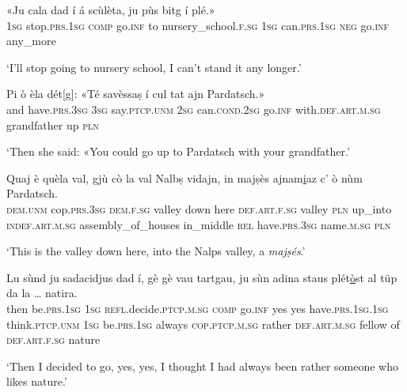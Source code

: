 \begin{linenumbers}
\gll  «Ju cala dad í á scùlèta, ju pùs bitg í plé.»\\
 \textsc{1sg} stop.\textsc{prs.1sg} \textsc{comp} go.\textsc{inf} to nursery\_school.\textsc{f.sg} \textsc{1sg} can.\textsc{prs.1sg} \textsc{neg} go.\textsc{inf} any\_more  \\
\end{linenumbers}
\medskip
\glt `I’ll stop going to nursery school, I can’t stand it any longer.'
\medskip

\begin{linenumbers}
\gll  Pi ò èla dét[g]: «Té savèssaṣ í cul tat ajn Pardatsch.»  \\
and have.\textsc{prs.3sg} \textsc{3sg} say.\textsc{ptcp.unm} \textsc{2sg} can.\textsc{cond.2sg} go.\textsc{inf} with.\textsc{def.art.m.sg} grandfather up \textsc{pln}  \\
\end{linenumbers}
\medskip
\glt `Then she said: «You could go up to Pardatsch with your grandfather.'
\medskip

\begin{linenumbers}
\gll Quaj è quèla val, gjù cò la val Nalbṣ vidajn, in majṣès\footnotemark{}  ajnam\underline{i}az c' ò nùm Pardatsch.  \\ 
 \textsc{dem.unm} cop.\textsc{prs.3sg} \textsc{dem.f.sg} valley down here  \textsc{def.art.f.sg} valley  \textsc{pln} up\_into \textsc{indef.art.m.sg} assembly\_of\_houses in\_middle \textsc{rel} have.\textsc{prs.3sg} name.\textsc{m.sg} \textsc{pln}\\
\end{linenumbers}
\medskip
\glt `This is the valley down here, into the Nalps valley, a \textit{majṣés}.' 
\medskip

\begin{linenumbers}
\gll  Lu sùnd ju sadacidjus dad í, gè gè vau tartgau, ju sùn adina staus plét\underline{ò}st al tüp da la … natira.  \\
then be.\textsc{prs.1sg} \textsc{1sg} \textsc{refl.}decide.\textsc{ptcp.m.sg} \textsc{comp} go.\textsc{inf} yes yes have.\textsc{prs.1sg.1sg} think.\textsc{ptcp.unm} \textsc{1sg} be.\textsc{prs.1sg} always \textsc{cop.ptcp.m.sg} rather \textsc{def.art.m.sg} fellow of \textsc{def.art.f.sg} {} nature   \\
\end{linenumbers}
\medskip
\glt `Then I decided to go, yes, yes, I thought I had always been rather someone who likes nature.'
\medskip

